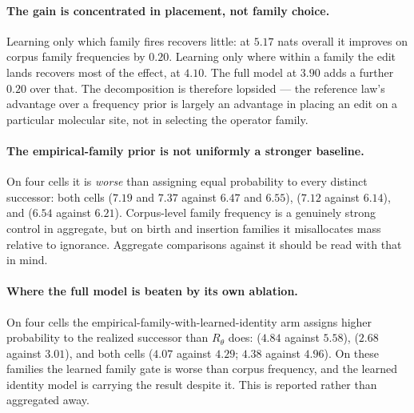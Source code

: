\paragraph{The gain is concentrated in placement, not family choice.}
Learning only which family fires recovers little: at $5.17$ nats overall it improves on corpus family frequencies by $0.20$. Learning only where within a family the edit lands recovers most of the effect, at $4.10$. The full model at $3.90$ adds a further $0.20$ over that. The decomposition is therefore lopsided --- the reference law's advantage over a frequency prior is largely an advantage in placing an edit on a particular molecular site, not in selecting the operator family.

\paragraph{The empirical-family prior is not uniformly a stronger baseline.}
On four cells it is \emph{worse} than assigning equal probability to every distinct successor: both  cells ($7.19$ and $7.37$ against $6.47$ and $6.55$),  ($7.12$ against $6.14$), and  ($6.54$ against $6.21$). Corpus-level family frequency is a genuinely strong control in aggregate, but on birth and insertion families it misallocates mass relative to ignorance. Aggregate comparisons against it should be read with that in mind.

\paragraph{Where the full model is beaten by its own ablation.}
On four cells the empirical-family-with-learned-identity arm assigns higher probability to the realized successor than $R_\theta$ does:  ($4.84$ against $5.58$),  ($2.68$ against $3.01$), and both  cells ($4.07$ against $4.29$; $4.38$ against $4.96$). On these families the learned family gate is worse than corpus frequency, and the learned identity model is carrying the result despite it. This is reported rather than aggregated away.

